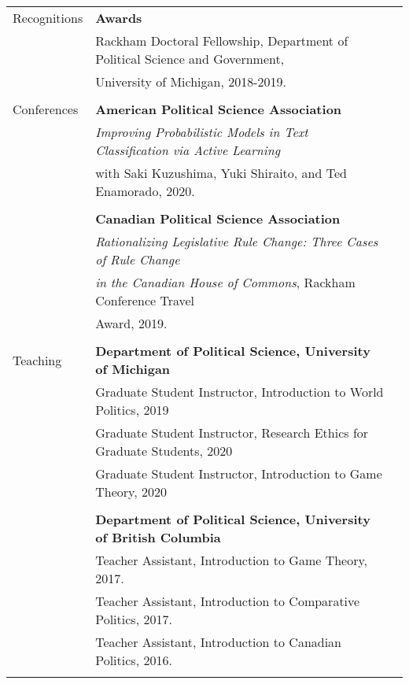 \documentclass[letterpaper,11pt,oneside]{article}
\begin{document}
\begin{tabular}{@{} l l l}
  \Large{Recognitions}   & \textbf{Awards} \\
                      & Rackham Doctoral Fellowship, Department of Political Science and Government, \\
                      & University of Michigan, 2018-2019. \\
                      & \\

  \Large{Conferences} & \textbf{American Political Science Association} \\
                      & \textit{Improving Probabilistic Models in Text Classification via Active Learning} \\
                      & with Saki Kuzushima, Yuki Shiraito, and Ted Enamorado, 2020.\\
  \\
                      & \textbf{Canadian Political Science Association} \\
                      & \textit{Rationalizing Legislative Rule Change: Three Cases of Rule      Change} \\
                      & \textit{in the Canadian House of Commons}, Rackham Conference Travel \\
                      & Award, 2019. \\
  \\

  \Large{Teaching}
                      & \textbf{Department of Political Science, University of Michigan} \\
                      & Graduate Student Instructor, Introduction to World Politics, 2019 \\
                      & Graduate Student Instructor, Research Ethics for Graduate Students, 2020 \\
                      & Graduate Student Instructor, Introduction to Game Theory, 2020 \\
  \\
                      & \textbf{Department of Political Science, University of British Columbia} \\
                      & Teacher Assistant, Introduction to Game Theory, 2017. \\
                      & Teacher Assistant, Introduction to Comparative Politics, 2017. \\
                      & Teacher Assistant, Introduction to Canadian Politics, 2016. \\
                      & \\
\end{tabular}

\vspace{2em}
\end{document}
